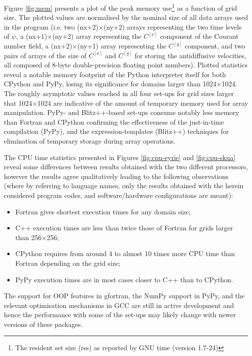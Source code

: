 \documentclass[final,5p,times,twocolumn]{elsarticle}
\begin{document}
  Figure \ref{fig:mem} presents a plot of the peak memory use\footnote{The resident set size (rss)
    as reported by GNU time (version 1.7-24)} as a function of grid size.
  The plotted values are normalised by the nominal size of all data arrays used in the program
    (i.e. two (nx+2)$\times$(ny+2) arrays representing the two time levels of $\psi$, 
     a (nx+1)$\times$(ny+2) array representing the $C^{[x]}$ component of the Courant number field,
     a (nx+2)$\times$(ny+1) array representing the $C^{[y]}$ component, 
     and two pairs of arrays of the size of $C^{[x]}$ and $C^{[y]}$ for storing the 
     antidiffusive velocities, all composed of 8-byte double-precision floating point numbers).
  Plotted statistics reveal a notable memory footprint of the Python interpreter itself
    for both CPython and PyPy, losing its significance for domains larger than 1024$\times$1024.
  The roughly asymptotic values reached in all four set-ups for grid sizes larger that 1024$\times$1024
    are indicative of the amount of temporary memory used for array manipulation.
  PyPy- and Blitz++-based set-ups consume notably less memory than Fortran and CPython confirming 
    the effectiveness of the just-in-time compilation (PyPy), and the expression-templates (Blitz++) techniques
    for elimination of temporary storage during array operations.

  The CPU time statistics presented in Figures \ref{fig:cpu-eyrie} and \ref{fig:cpu-skua} reveal
    some differences between results obtained with the two different processors,
    however the results agree qualitatively leading to the following observations
    (where by referring to language names, only the results obtained with the herein considered
     program codes, and software/hardware configurations are meant):
  \begin{itemize}
    \item{Fortran gives shortest execution times for any domain size;}
    \item{C++ execution times are less than twice those of Fortran for grids larger than 
      256$\times$256;}
    \item{CPython requires from around 4 to almost 10 times more CPU time than Fortran depending on the grid size;}
    \item{PyPy execution times are in most cases closer to C++ than to CPython.}
  \end{itemize}
  The support for OOP features in gfortran, the NumPy support in PyPy, and the relevant optimisation
    mechanisms in GCC are still in active development and hence the performance with some of the set-ups may 
    likely change with newer versions of these packages. 
\end{document}
